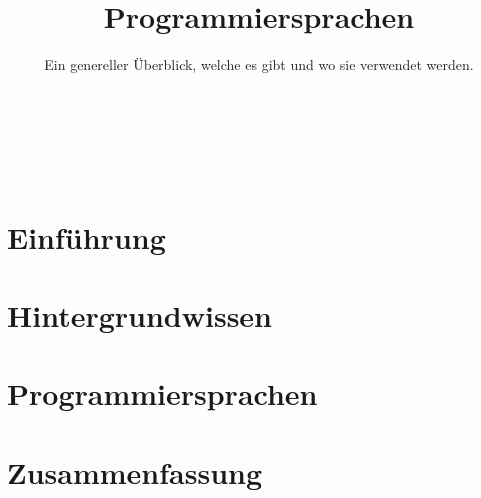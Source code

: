 

\title{Programmiersprachen}
\subtitle{Ein genereller Überblick, welche es gibt und wo sie verwendet werden.}




\backgroundTitle
\begin{frame}
    \thispagestyle{empty}
    \begin{columns}
        \column{0.6\paperwidth}
        \color{hhuBlau}
        \LARGE \inserttitle\\[\baselineskip]
        \large \insertauthor
    \end{columns}
\end{frame}
\backgroundNormal

\section{Einführung}



\section{Hintergrundwissen}





\section{Programmiersprachen}



\section{Zusammenfassung}







